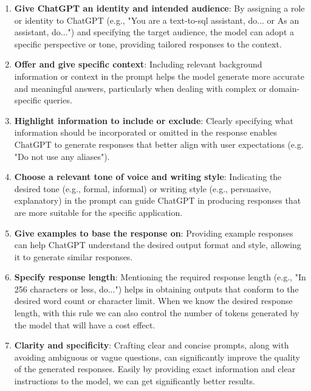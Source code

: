\begin{enumerate}
    \item \textbf{Give ChatGPT an identity and intended audience}: By assigning a role or identity to ChatGPT (e.g., "You are a text-to-sql assistant, do... or As an assistant, do...") and specifying the target audience, the model can adopt a specific perspective or tone, providing tailored responses to the context.

    \item \textbf{Offer and give specific context}: Including relevant background information or context in the prompt helps the model generate more accurate and meaningful answers, particularly when dealing with complex or domain-specific queries.

    \item \textbf{Highlight information to include or exclude}: Clearly specifying what information should be incorporated or omitted in the response enables ChatGPT to generate responses that better align with user expectations (e.g. "Do not use any aliases").

    \item \textbf{Choose a relevant tone of voice and writing style}: Indicating the desired tone (e.g., formal, informal) or writing style (e.g., persuasive, explanatory) in the prompt can guide ChatGPT in producing responses that are more suitable for the specific application.

    \item \textbf{Give examples to base the response on}: Providing example responses can help ChatGPT understand the desired output format and style, allowing it to generate similar responses.

    \item \textbf{Specify response length}: Mentioning the required response length (e.g., "In 256 characters or less, do...") helps in obtaining outputs that conform to the desired word count or character limit. When we know the desired response length, with this rule we can also control the number of tokens generated by the model that will have a cost effect.

    \item \textbf{Clarity and specificity}: Crafting clear and concise prompts, along with avoiding ambiguous or vague questions, can significantly improve the quality of the generated responses. Easily by providing exact information and clear instructions to the model, we can get significantly better results.
\end{enumerate}


